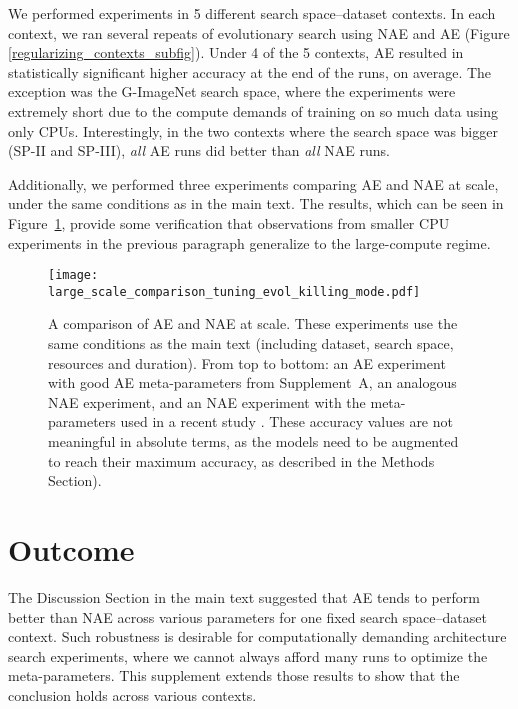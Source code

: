 \documentclass[letterpaper]{article} \usepackage{aaai19}  \usepackage{times}  \usepackage{helvet}  \usepackage{courier}  \usepackage{graphicx}  \frenchspacing
\begin{document}
We performed experiments in 5 different search space--dataset contexts. In each context, we ran several repeats of evolutionary search using NAE and AE (Figure \ref{regularizing_contexts_subfig}). Under 4 of the 5 contexts, AE resulted in statistically significant higher accuracy at the end of the runs, on average. The exception was the G-ImageNet search space, where the experiments were extremely short due to the compute demands of training on so much data using only CPUs. Interestingly, in the two contexts where the search space was bigger (SP-II and SP-III), \textit{all} AE runs did better than \textit{all} NAE runs.

Additionally, we performed three experiments comparing AE and NAE at scale, under the same conditions as in the main text. The results, which can be seen in Figure~\ref{regularizing_large_fig}, provide some verification that observations from smaller CPU experiments in the previous paragraph generalize to the large-compute regime.

\begin{figure}[ht]
\centering
\texttt{[image: large\_scale\_comparison\_tuning\_evol\_killing\_mode.pdf]}
\caption{
A comparison of AE and NAE at scale. These experiments use the same conditions as the main text (including dataset, search space, resources and duration). From top to bottom: an AE experiment with good AE meta-parameters from Supplement~A, an analogous NAE experiment, and an NAE experiment with the meta-parameters used in a recent study \cite{real2017large}. These accuracy values are not meaningful in absolute terms, as the models need to be augmented to reach their maximum accuracy, as described in the Methods Section).
}
\label{regularizing_large_fig}
\end{figure}


\section{Outcome}


The Discussion Section in the main text suggested that AE tends to perform better than NAE across various parameters for one fixed search space--dataset context. Such robustness is desirable for computationally demanding architecture search experiments, where we cannot always afford many runs to optimize the meta-parameters. This supplement extends those results to show that the conclusion holds across various contexts.


\FloatBarrier
\clearpage
\renewcommand{\thesection}{C-\arabic{section}}
\renewcommand{\thefigure}{C-\arabic{figure}}
\setcounter{section}{0}
\setcounter{figure}{0}
\setcounter{table}{0}
\end{document}
